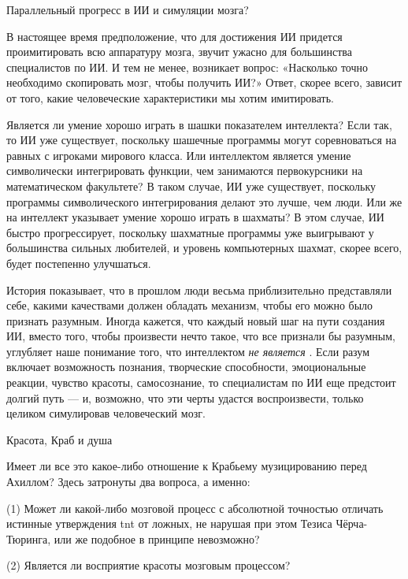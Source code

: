\documentclass[../main.tex]{subfiles}
\begin{document}
Параллельный прогресс в ИИ и симуляции мозга?

В настоящее время предположение, что для достижения ИИ придется проимитировать всю аппаратуру мозга, звучит ужасно для большинства специалистов по ИИ\@. И тем не менее, возникает вопрос: «Насколько точно необходимо скопировать мозг, чтобы получить ИИ?» Ответ, скорее всего, зависит от того, какие человеческие характеристики мы хотим имитировать.

Является ли умение хорошо играть в шашки показателем интеллекта? Если так, то ИИ уже существует, поскольку шашечные программы могут соревноваться на равных с игроками мирового класса. Или интеллектом является умение символически интегрировать функции, чем занимаются первокурсники на математическом факультете? В таком случае, ИИ уже существует, поскольку программы символического интегрирования делают это лучше, чем люди. Или же на интеллект указывает умение хорошо играть в шахматы? В этом случае, ИИ быстро прогрессирует, поскольку шахматные программы уже выигрывают у большинства сильных любителей, и уровень компьютерных шахмат, скорее всего, будет постепенно улучшаться.

История показывает, что в прошлом люди весьма приблизительно представляли себе, какими качествами должен обладать механизм, чтобы его можно было признать разумным. Иногда кажется, что каждый новый шаг на пути создания ИИ, вместо того, чтобы произвести нечто такое, что все признали бы разумным, углубляет наше понимание того, что интеллектом \emph{не является} . Если разум включает возможность познания, творческие способности, эмоциональные реакции, чувство красоты, самосознание, то специалистам по ИИ еще предстоит долгий путь --- и, возможно, что эти черты удастся воспроизвести, только целиком симулировав человеческий мозг.

Красота, Краб и душа

Имеет ли все это какое-либо отношение к Крабьему музицированию перед Ахиллом? Здесь затронуты два вопроса, а именно:

(1) Может ли какой-либо мозговой процесс с абсолютной точностью отличать истинные утверждения \acs{tnt} от ложных, не нарушая при этом Тезиса Чёрча-Тюринга, или же подобное в принципе невозможно?

(2) Является ли восприятие красоты мозговым процессом?
\end{document}
